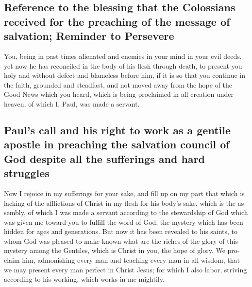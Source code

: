 \begin{paracol}{2}
\begin{otherlanguage}{english}
\hypertarget{reference-to-the-blessing-that-the-colossians-received-for-the-preaching-of-the-message-of-salvation-reminder-to-persevere}{%
\subsection{Reference to the blessing that the Colossians received for
the preaching of the message of salvation; Reminder to
Persevere}\label{reference-to-the-blessing-that-the-colossians-received-for-the-preaching-of-the-message-of-salvation-reminder-to-persevere}}

 You, being in past times alienated and enemies in your
mind in your evil deeds,  yet now he has reconciled in
the body of his flesh through death, to present you holy and without
defect and blameless before him,  if it is so that you
continue in the faith, grounded and steadfast, and not moved away from
the hope of the Good News which you heard, which is being proclaimed in
all creation under heaven, of which I, Paul, was made a servant.

\hypertarget{pauls-call-and-his-right-to-work-as-a-gentile-apostle-in-preaching-the-salvation-council-of-god-despite-all-the-sufferings-and-hard-struggles}{%
\subsection{Paul's call and his right to work as a gentile apostle in
preaching the salvation council of God despite all the sufferings and
hard
struggles}\label{pauls-call-and-his-right-to-work-as-a-gentile-apostle-in-preaching-the-salvation-council-of-god-despite-all-the-sufferings-and-hard-struggles}}

 Now I rejoice in my sufferings for your sake, and fill
up on my part that which is lacking of the afflictions of Christ in my
flesh for his body's sake, which is the assembly,  of
which I was made a servant according to the stewardship of God which was
given me toward you to fulfill the word of God,  the
mystery which has been hidden for ages and generations. But now it has
been revealed to his saints,  to whom God was pleased to
make known what are the riches of the glory of this mystery among the
Gentiles, which is Christ in you, the hope of glory.  We
proclaim him, admonishing every man and teaching every man in all
wisdom, that we may present every man perfect in Christ Jesus;
 for which I also labor, striving according to his
working, which works in me mightily.


\end{otherlanguage}
\end{paracol}
